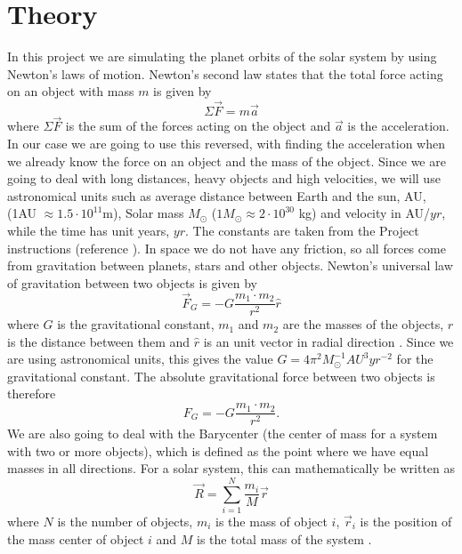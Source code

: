 \documentclass[norsk,a4paper,12pt]{article}
\begin{document}
\section{Theory}
In this project we are simulating the planet orbits of the solar system by using Newton's laws of motion. Newton's second law states that the total force acting on an object with mass $m$ is given by
\begin{equation}
\Sigma\vec{F}=m\vec{a}
\label{eq:N2L}
\end{equation}
where $\Sigma \vec{F}$ is the sum of the forces acting on the object and $\vec{a}$ is the acceleration. In our case we are going to use this reversed, with finding the acceleration when we already know the force on an object and the mass of the object. Since we are going to deal with long distances, heavy objects and high velocities, we will use astronomical units such as average distance between Earth and the sun, AU, (1AU $\approx1.5\cdot10^{11}$m), Solar mass $M_\odot$ ($1M_{\odot}\approx2\cdot10^{30}$ kg) and velocity in AU/$yr$, while the time has unit years, $yr$. The constants are taken from the Project instructions (reference \cite {Project_text}). In space we do not have any friction, so all forces come from gravitation between planets, stars and other objects. Newton's universal law of gravitation between two objects is given by
\begin{equation}
\vec{F}_G=-G\frac{m_1\cdot m_2}{r^2}\hat{r}
\label{eq:GravitationalForce}
\end{equation}
where $G$ is the gravitational constant, $m_1$ and $m_2$ are the masses of the objects, $r$ is the distance between them and $\hat{r}$ is an unit vector in radial direction \cite{Barycenter}. Since we are using astronomical units, this gives the value $G = 4\pi^2 M_{\odot} ^{-1} AU^3 yr^{-2}$ \cite{Project_text} for the gravitational constant.  The absolute gravitational force between two objects is therefore
\begin{equation}
F_G=-G\frac{m_1\cdot m_2}{r^2}.
\label{eq:absGravitationalForce}
\end{equation}
We are also going to deal with the Barycenter (the center of mass for a system with two or more objects), which is defined as the point where we have equal masses in all directions. For a solar system, this can mathematically be written as
\begin{equation}
\vec{R}=\sum_{i=1}^N \frac{m_i}{M}\vec{r}
\end{equation}
where $N$ is the number of objects, $m_i$ is the mass of object $i$, $\vec{r}_i$ is the position of the mass center of object $i$ and $M$ is the total mass of the system \cite{Barycenter}.
\end{document}
